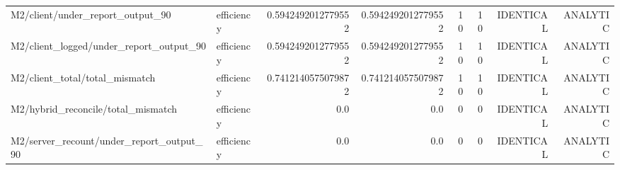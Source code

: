 \begin{table}[t]
{\begin{tabular}{llrrrrrr}
M2/client/under\_report\_output\_90 & efficiency & 0.5942492012779552 & 0.5942492012779552 & 10 & 10 & IDENTICAL & ANALYTIC \\
M2/client\_logged/under\_report\_output\_90 & efficiency & 0.5942492012779552 & 0.5942492012779552 & 10 & 10 & IDENTICAL & ANALYTIC \\
M2/client\_total/total\_mismatch & efficiency & 0.7412140575079872 & 0.7412140575079872 & 10 & 10 & IDENTICAL & ANALYTIC \\
M2/hybrid\_reconcile/total\_mismatch & efficiency & 0.0 & 0.0 & 0 & 0 & IDENTICAL & ANALYTIC \\
M2/server\_recount/under\_report\_output\_90 & efficiency & 0.0 & 0.0 & 0 & 0 & IDENTICAL & ANALYTIC \\
\bottomrule
\end{tabular}
}
\end{table}
